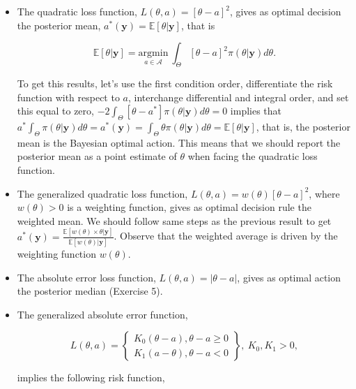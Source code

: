 \begin{itemize}
	\item The quadratic loss function, $L({\theta},a)=[{\theta}-a]^2$, gives as optimal decision the posterior mean, $a^*(\mathbf{y})=\mathbb{E}[{\theta}|\mathbf{y}]$, that is 
		
	\begin{equation*}
		\mathbb{E}[{\theta}|\mathbf{y}] = \underset{a \in \mathcal{A}}{\mathrm{argmin}} \  \int_{{\Theta}} [{\theta}-a]^2\pi({\theta}|\mathbf{y})d{\theta}.
	\end{equation*}
	
	To get this results, let's use the first condition order, differentiate the risk function with respect to $a$, interchange differential and integral order, and set this equal to zero, $-2\int_{{\Theta}} [{\theta}-a^*]\pi({\theta}|\mathbf{y})d{\theta}=0$ implies that $a^*\int_{{\Theta}} \pi({\theta}|\mathbf{y})d{\theta}=a^*(\mathbf{y})=\int_{{\Theta}} {\theta}\pi({\theta}|\mathbf{y})d{\theta}=\mathbb{E}[{\theta}|\mathbf{y}]$, that is, the posterior mean is the Bayesian optimal action. This means that we should report the posterior mean as a point estimate of $\theta$ when facing the quadratic loss function.
	
	\item The generalized quadratic loss function,  $L({\theta},a)=w({\theta})[{\theta}-a]^2$, where $w({\theta})>0$ is a weighting function, gives as optimal decision rule the weighted mean. We should follow same steps as the previous result to get   $a^*(\mathbf{y})=\frac{\mathbb{E}[w({\theta})\times{\theta}|\mathbf{y}]}{\mathbb{E}[w({\theta})|\mathbf{y}]}$. Observe that the weighted average is driven by the weighting function $w({\theta})$.
	
	\item The absolute error loss function, $L({\theta},a)=|{\theta}-a|$, gives as optimal action the posterior median (Exercise 5).
	
	\item The generalized absolute error function,
	
	\begin{equation*}
		L(\theta,a)=\begin{Bmatrix} K_0(\theta-a), \theta-a\geq 0\\
			K_1(a-\theta), \theta-a < 0 \end{Bmatrix}, \ K_0,K_1>0,
	\end{equation*}
	
	implies the following risk function,
	

\end{itemize}
